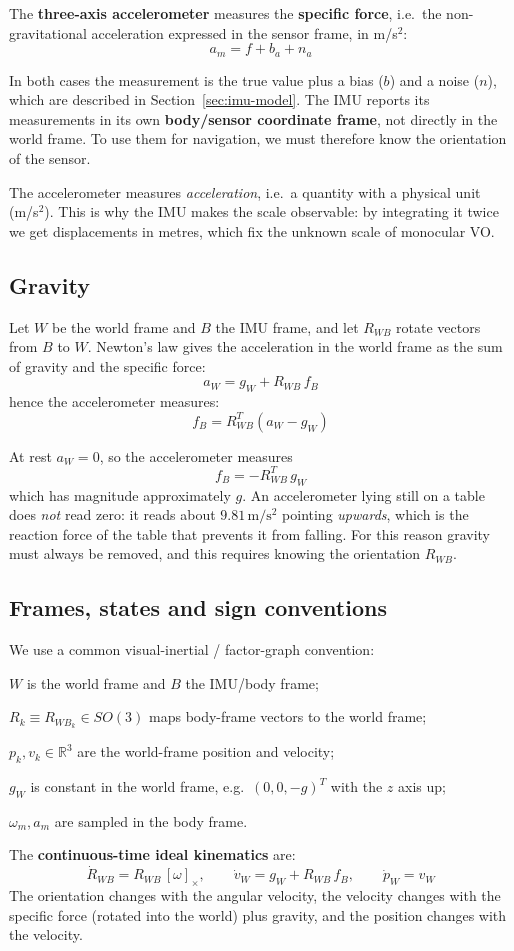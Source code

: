 The \textbf{three-axis accelerometer} measures the \textbf{specific force}, i.e.\ the non-gravitational acceleration expressed in the sensor frame, in m/s$^2$:
\[
a_m = f + b_a + n_a
\]

In both cases the measurement is the true value plus a bias ($b$) and a noise ($n$), which are described in Section~\ref{sec:imu-model}. The IMU reports its measurements in its own \textbf{body/sensor coordinate frame}, not directly in the world frame. To use them for navigation, we must therefore know the orientation of the sensor.

The accelerometer measures \emph{acceleration}, i.e.\ a quantity with a physical unit (m/s$^2$). This is why the IMU makes the scale observable: by integrating it twice we get displacements in metres, which fix the unknown scale of monocular VO.

\subsection{Gravity}
Let $W$ be the world frame and $B$ the IMU frame, and let $R_{WB}$ rotate vectors from $B$ to $W$. Newton's law gives the acceleration in the world frame as the sum of gravity and the specific force:
\[
a_W = g_W + R_{WB}\, f_B
\]
hence the accelerometer measures:
\[
\boxed{f_B = R_{WB}^T \left(a_W - g_W\right)}
\]

At rest $a_W = 0$, so the accelerometer measures
\[
f_B = -R_{WB}^T\, g_W
\]
which has magnitude approximately $g$. An accelerometer lying still on a table does \emph{not} read zero: it reads about $9.81\,\mathrm{m/s^2}$ pointing \emph{upwards}, which is the reaction force of the table that prevents it from falling. For this reason gravity must always be removed, and this requires knowing the orientation $R_{WB}$.

\subsection{Frames, states and sign conventions}
We use a common visual-inertial / factor-graph convention:
\begin{compactitemize}
    \item $W$ is the world frame and $B$ the IMU/body frame;
    \item $R_k \equiv R_{WB_k} \in SO(3)$ maps body-frame vectors to the world frame;
    \item $p_k, v_k \in \mathbb{R}^3$ are the world-frame position and velocity;
    \item $g_W$ is constant in the world frame, e.g.\ $(0, 0, -g)^T$ with the $z$ axis up;
    \item $\omega_m, a_m$ are sampled in the body frame.
\end{compactitemize}
The \textbf{continuous-time ideal kinematics} are:
\[
\dot R_{WB} = R_{WB}\, [\omega]_\times, \qquad
\dot v_W = g_W + R_{WB}\, f_B, \qquad
\dot p_W = v_W
\]
The orientation changes with the angular velocity, the velocity changes with the specific force (rotated into the world) plus gravity, and the position changes with the velocity.

